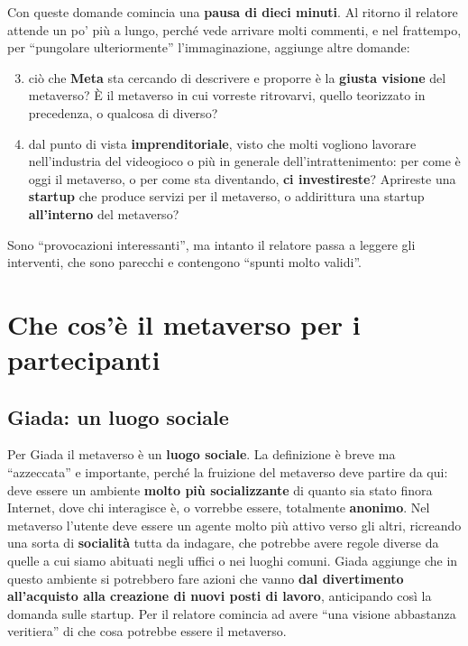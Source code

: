 Con queste domande comincia una \textbf{pausa di dieci minuti}. Al ritorno il
relatore attende un po' più a lungo, perché vede arrivare molti commenti, e nel
frattempo, per ``pungolare ulteriormente'' l'immaginazione, aggiunge altre
domande:
\begin{enumerate}\setcounter{enumi}{2}
  \item ciò che \textbf{Meta} sta cercando di descrivere e proporre è la
        \textbf{giusta visione} del metaverso? È il metaverso in cui vorreste
        ritrovarvi, quello teorizzato in precedenza, o qualcosa di diverso?
  \item dal punto di vista \textbf{imprenditoriale}, visto che molti vogliono
        lavorare nell'industria del videogioco o più in generale
        dell'intrattenimento: per come è oggi il metaverso, o per come sta
        diventando, \textbf{ci investireste}? Aprireste una \textbf{startup} che
        produce servizi per il metaverso, o addirittura una startup
        \textbf{all'interno} del metaverso?
\end{enumerate}
Sono ``provocazioni interessanti'', ma intanto il relatore passa a leggere gli
interventi, che sono parecchi e contengono ``spunti molto validi''.

\section{Che cos'è il metaverso per i partecipanti}
\label{z8:sec:definizioni}

\subsection{Giada: un luogo sociale}

Per Giada il metaverso è un \textbf{luogo sociale}. La definizione è breve ma
``azzeccata'' e importante, perché la fruizione del metaverso deve partire da
qui: deve essere un ambiente \textbf{molto più socializzante} di quanto sia stato
finora Internet, dove chi interagisce è, o vorrebbe essere, totalmente
\textbf{anonimo}. Nel metaverso l'utente deve essere un agente molto più attivo
verso gli altri, ricreando una sorta di \textbf{socialità} tutta da indagare,
che potrebbe avere regole diverse da quelle a cui siamo abituati negli uffici o
nei luoghi comuni. Giada aggiunge che in questo ambiente si potrebbero fare
azioni che vanno \textbf{dal divertimento all'acquisto alla creazione di nuovi
posti di lavoro}, anticipando così la domanda sulle startup. Per il relatore
comincia ad avere ``una visione abbastanza veritiera'' di che cosa potrebbe
essere il metaverso.

